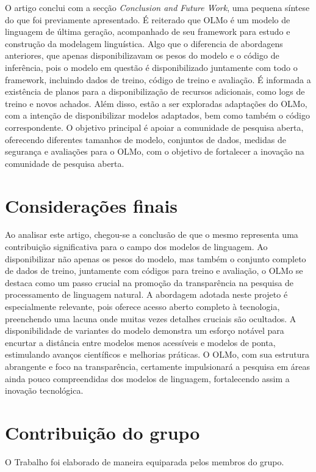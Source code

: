 \documentclass{article}
\begin{document}
\newpage

O artigo conclui com a secção \textit{Conclusion and Future Work}, uma pequena síntese do que foi previamente apresentado. 
É reiterado que OLMo é um modelo de linguagem de última geração, acompanhado de seu framework para estudo e construção da modelagem linguística.
Algo que o diferencia de abordagens anteriores, que apenas disponibilizavam os pesos do modelo e o código de inferência, pois o modelo em questão é disponibilizado juntamente com todo o framework, incluindo dados de treino, código de treino e avaliação.
É informada a existência de planos para a disponibilização de recursos adicionais, como logs de treino e novos achados.
Além disso, estão a ser exploradas adaptações do OLMo, com a intenção de disponibilizar modelos adaptados, bem como também o código correspondente.
O objetivo principal é apoiar a comunidade de pesquisa aberta, oferecendo diferentes tamanhos de modelo, conjuntos de dados, medidas de segurança e avaliações para o OLMo, com o objetivo de fortalecer a inovação na comunidade de pesquisa aberta.

\section*{Considerações finais}
Ao analisar este artigo, chegou-se a conclusão de que o mesmo representa uma contribuição significativa para o campo dos modelos de linguagem. Ao disponibilizar não apenas os pesos do modelo, mas também o conjunto completo de dados de treino, juntamente com códigos para treino e avaliação, o OLMo se destaca como um passo crucial na promoção da transparência na pesquisa de processamento de linguagem natural. A abordagem adotada neste projeto é especialmente relevante, pois oferece acesso aberto completo à tecnologia, preenchendo uma lacuna onde muitas vezes detalhes cruciais são ocultados. A disponibilidade de variantes do modelo demonstra um esforço notável para encurtar a distância entre modelos menos acessíveis e modelos de ponta, estimulando avanços científicos e melhorias práticas. O OLMo, com sua estrutura abrangente e foco na transparência, certamente impulsionará a pesquisa em áreas ainda pouco compreendidas dos modelos de linguagem, fortalecendo assim a inovação tecnológica.

\section*{Contribuição do grupo}
O Trabalho foi elaborado de maneira equiparada pelos membros do grupo.
\end{document}
